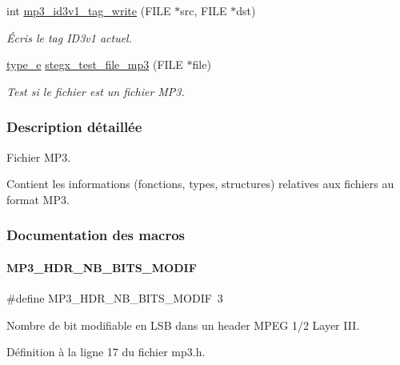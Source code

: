 \begin{DoxyCompactItemize}
int \hyperlink{a00089_a0f2f8f49760a8be1dc011675b01f63d1}{mp3\+\_\+id3v1\+\_\+tag\+\_\+write} (F\+I\+LE $\ast$src, F\+I\+LE $\ast$dst)
\begin{DoxyCompactList}\small\item\em Écris le tag I\+D3v1 actuel. \end{DoxyCompactList}\item 
\hyperlink{a00047_af1ca434cca36ba9fb2a45f6cef3a16d6}{type\+\_\+e} \hyperlink{a00089_a581193a38ac3c779c8920bd3be9883fc}{stegx\+\_\+test\+\_\+file\+\_\+mp3} (F\+I\+LE $\ast$file)
\begin{DoxyCompactList}\small\item\em Test si le fichier est un fichier M\+P3. \end{DoxyCompactList}\end{DoxyCompactItemize}


\subsubsection{Description détaillée}
Fichier M\+P3. 

Contient les informations (fonctions, types, structures) relatives aux fichiers au format M\+P3. 

\subsubsection{Documentation des macros}
\mbox{\label{a00089_a8922ae84b90bc792376936798a647326}} 
\paragraph{\texorpdfstring{M\+P3\+\_\+\+H\+D\+R\+\_\+\+N\+B\+\_\+\+B\+I\+T\+S\+\_\+\+M\+O\+D\+IF}{MP3\_HDR\_NB\_BITS\_MODIF}}
{\footnotesize\ttfamily \#define M\+P3\+\_\+\+H\+D\+R\+\_\+\+N\+B\+\_\+\+B\+I\+T\+S\+\_\+\+M\+O\+D\+IF~3}

Nombre de bit modifiable en L\+SB dans un header M\+P\+EG 1/2 Layer I\+II. 

Définition à la ligne 17 du fichier mp3.\+h.



